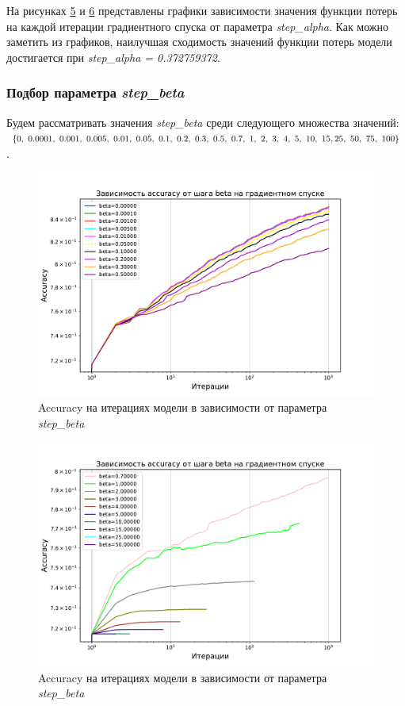 \documentclass[14pt]{extarticle}
\begin{document}
На рисунках \hyperref[fig:exp_4_loss_alpha_1]{5} и \hyperref[fig:exp_4_loss_alpha_2]{6} представлены графики зависимости значения функции потерь на каждой итерации градиентного спуска от параметра \textit{step\_alpha}. Как можно заметить из графиков, наилучшая сходимость значений функции потерь модели достигается при \textit{step\_alpha = 0.372759372}.

\subsubsection{Подбор параметра \textit{step\_beta}}

Будем рассматривать значения \textit{step\_beta} среди следующего множества значений: \( \{0, \ 0.0001, \ 0.001, \ 0.005, \ 0.01, \ 0.05, \ 0.1, \ 0.2, \ 0.3, \ 0.5, \ 0.7, \ 1, \ 2, \ 3, \ 4, \ 5, \ 10, \ 15, \\ 25, \ 50, \ 75, \ 100\} \).

\begin{figure}[H]
    \centering
    \includegraphics[width=0.7\linewidth]
    {exp_4_acc_beta_1.pdf}
    \caption{Accuracy на итерациях модели в зависимости от параметра \textit{step\_beta}}
    \label{fig:exp_4_acc_beta_1}
\end{figure}

\begin{figure}[H]
    \centering
    \includegraphics[width=0.7\linewidth]
    {exp_4_acc_beta_2.pdf}
    \caption{Accuracy на итерациях модели в зависимости от параметра \textit{step\_beta}}
    \label{fig:exp_4_acc_beta_2}
\end{figure}
\end{document}
